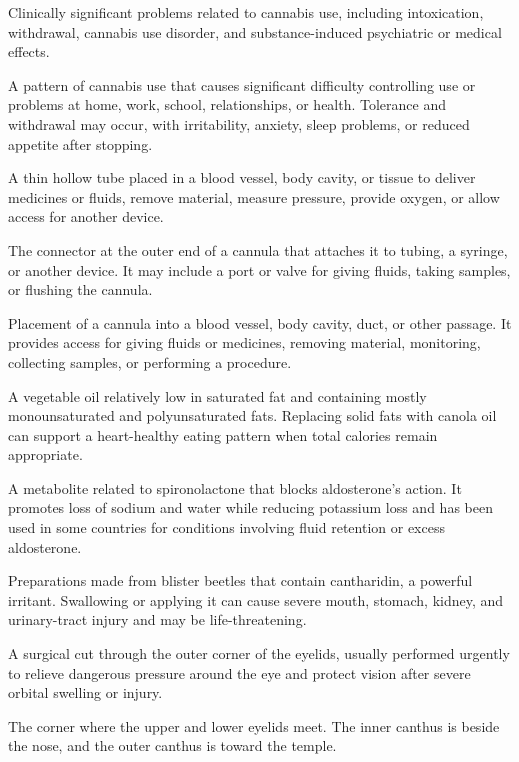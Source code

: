  Clinically significant problems related to cannabis use, including intoxication, withdrawal, cannabis use disorder, and substance-induced psychiatric or medical effects.

 A pattern of cannabis use that causes significant difficulty controlling use or problems at home, work, school, relationships, or health. Tolerance and withdrawal may occur, with irritability, anxiety, sleep problems, or reduced appetite after stopping.

 A thin hollow tube placed in a blood vessel, body cavity, or tissue to deliver medicines or fluids, remove material, measure pressure, provide oxygen, or allow access for another device.

 The connector at the outer end of a cannula that attaches it to tubing, a syringe, or another device. It may include a port or valve for giving fluids, taking samples, or flushing the cannula.

 Placement of a cannula into a blood vessel, body cavity, duct, or other passage. It provides access for giving fluids or medicines, removing material, monitoring, collecting samples, or performing a procedure.

 A vegetable oil relatively low in saturated fat and containing mostly monounsaturated and polyunsaturated fats. Replacing solid fats with canola oil can support a heart-healthy eating pattern when total calories remain appropriate.

 A metabolite related to spironolactone that blocks aldosterone's action. It promotes loss of sodium and water while reducing potassium loss and has been used in some countries for conditions involving fluid retention or excess aldosterone.

 Preparations made from blister beetles that contain cantharidin, a powerful irritant. Swallowing or applying it can cause severe mouth, stomach, kidney, and urinary-tract injury and may be life-threatening.

 A surgical cut through the outer corner of the eyelids, usually performed urgently to relieve dangerous pressure around the eye and protect vision after severe orbital swelling or injury.

 The corner where the upper and lower eyelids meet. The inner canthus is beside the nose, and the outer canthus is toward the temple.

